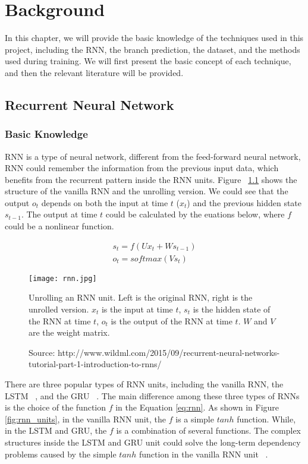 \chapter{Background}
\label{chap:background}
In this chapter, we will provide the basic knowledge of the techniques used in this project, including the RNN, the branch prediction, the dataset, and the methods used during training. We will first present the basic concept of each technique, and then the relevant literature will be provided.

\section{Recurrent Neural Network}
\label{sec:rnn}
\subsection{Basic Knowledge}
\label{sec:bk_rnn}
RNN is a type of neural network, different from the feed-forward neural network, RNN could remember the information from the previous input data, which benefits from the recurrent pattern inside the RNN units. Figure ~\ref{fig:unrolled} shows the structure of the vanilla RNN and the unrolling version. We could see that the output $o_t$ depends on both the input at time $t$ ($x_t$) and the previous hidden state $s_{t-1}$. The output at time $t$ could be calculated by the euations below, where $f$ could be a nonlinear function.

\begin{equation}
\begin{aligned}
s_t = f(Ux_t + Ws_{t-1})\\ 
o_t = softmax(Vs_t)
\label{eq:rnn}
\end{aligned}
\end{equation}

\begin{figure}[H]
\centering
\captionsetup{justification=centering,margin=1cm}
\texttt{[image: rnn.jpg]}
\caption{Unrolling an RNN unit. Left is the original RNN, right is the unrolled version. $x_t$ is the input at time $t$, $s_t$ is the hidden state of the RNN at time $t$, $o_t$ is the output of the RNN at time $t$. $W$ and $V$ are the weight matrix.}
\caption*{Source: http://www.wildml.com/2015/09/recurrent-neural-networks-tutorial-part-1-introduction-to-rnns/}
\label{fig:unrolled}
\end{figure}

There are three popular types of RNN units, including the vanilla RNN, the LSTM ~\citep{hochreiter1997long}, and the GRU ~\citep{cho2014learning}. The main difference among these three types of RNNs is the choice of the function $f$ in the Equation \ref{eq:rnn}. As shown in Figure \ref{fig:rnn_units}, in the vanilla RNN unit, the $f$ is a simple $tanh$ function. While, in the LSTM and GRU, the $f$ is a combination of several functions. The complex structures inside the LSTM and GRU unit could solve the long-term dependency problems caused by the simple $tanh$ function in the vanilla RNN unit ~\citep{hochreiter1997long}.

